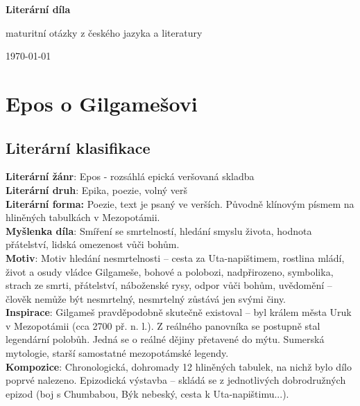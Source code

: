 \documentclass[12pt, a4paper]{article}
\newcommand{\mybf}[1]{\textcolor[RGB]{0, 179, 219}{\textbf{#1}}}
\begin{document}
\begin{titlepage}
	\centering
	\vspace*{2cm}
	{\color{titlecolor}\Huge\bfseries Literární díla\par}
	\vspace{1cm}
	{\color{sectioncolor}\Large maturitní otázky z českého jazyka a literatury\par}
	\vspace{3cm}
	\vspace{0.5cm}
	\vfill
	{\color{subsectioncolor}\today\par}
\end{titlepage}

\tableofcontents
\newpage

\section{Epos o Gilgamešovi}

\subsection*{Literární klasifikace}
\mybf{Literární žánr}: Epos - rozsáhlá epická veršovaná skladba\\[3pt]
\mybf{Literární druh}: Epika, poezie, volný verš\\[3pt]
\mybf{Literární forma:} Poezie, text je psaný ve verších. Původně klínovým písmem na hliněných tabulkách v Mezopotámii.\\[10pt]
\mybf{Myšlenka díla}: Smíření se smrtelností, hledání smyslu života, hodnota přátelství, lidská omezenost vůči bohům.\\[10pt]
\mybf{Motiv}: Motiv hledání nesmrtelnosti -- cesta za Uta-napištimem, rostlina mládí, život a osudy vládce Gilgameše, bohové a polobozi, nadpřirozeno, symbolika, strach ze smrti, přátelství, náboženské rysy, odpor vůči bohům, uvědomění -- člověk nemůže být nesmrtelný, nesmrtelný zůstává jen svými činy.\\[10pt]
\mybf{Inspirace}: Gilgameš pravděpodobně skutečně existoval -- byl králem města Uruk v Mezopotámii (cca 2700 př. n. l.). Z reálného panovníka se postupně stal legendární polobůh. Jedná se o reálné dějiny přetavené do mýtu. Sumerská mytologie, starší samostatné mezopotámské legendy.\\[10pt]
\mybf{Kompozice}: Chronologická, dohromady 12 hliněných tabulek, na nichž bylo dílo poprvé nalezeno. Epizodická výstavba -- skládá se z jednotlivých dobrodružných epizod (boj s Chumbabou, Býk nebeský, cesta k Uta-napištimu...).
\end{document}
